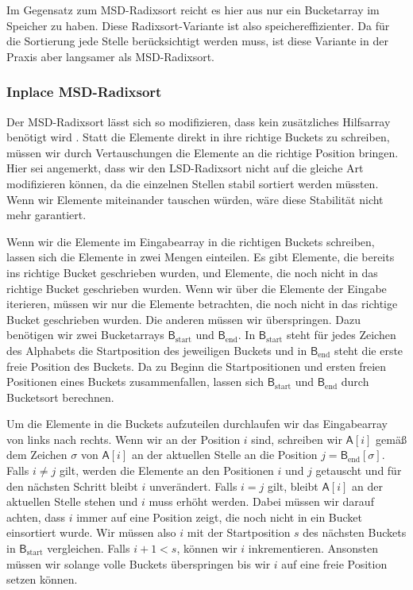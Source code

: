 Im Gegensatz zum MSD-Radixsort reicht es hier aus nur ein Bucketarray im Speicher zu haben.
Diese Radixsort-Variante ist also speichereffizienter.
Da für die Sortierung jede Stelle berücksichtigt werden muss,
ist diese Variante in der Praxis aber langsamer als MSD-Radixsort.

\subsubsection{Inplace MSD-Radixsort}
\label{sort:radix:inplace}

Der MSD-Radixsort lässt sich so modifizieren, dass kein zusätzliches Hilfsarray benötigt wird \cite{radixsort:inplace}.
Statt die Elemente direkt in ihre richtige Buckets zu schreiben,
müssen wir durch Vertauschungen die Elemente an die richtige Position bringen.
Hier sei angemerkt, dass wir den LSD-Radixsort nicht auf die gleiche Art modifizieren können,
da die einzelnen Stellen stabil sortiert werden müssten.
Wenn wir Elemente miteinander tauschen würden, wäre diese Stabilität nicht mehr garantiert.

Wenn wir die Elemente im Eingabearray in die richtigen Buckets schreiben,
lassen sich die Elemente in zwei Mengen einteilen.
Es gibt Elemente, die bereits ins richtige Bucket geschrieben wurden,
und Elemente, die noch nicht in das richtige Bucket geschrieben wurden.
Wenn wir über die Elemente der Eingabe iterieren, müssen wir nur die Elemente betrachten,
die noch nicht in das richtige Bucket geschrieben wurden.
Die anderen müssen wir überspringen.
Dazu benötigen wir zwei Bucketarrays $\mathsf{B}_{\text{start}}$ und $\mathsf{B}_{\text{end}}$.
In $\mathsf{B}_{\text{start}}$ steht für jedes Zeichen des Alphabets die Startposition des jeweiligen Buckets 
und in $\mathsf{B}_{\text{end}}$ steht die erste freie Position des Buckets.
Da zu Beginn die Startpositionen und ersten freien Positionen eines Buckets zusammenfallen,
lassen sich $\mathsf{B}_{\text{start}}$ und $\mathsf{B}_{\text{end}}$ durch Bucketsort berechnen.

Um die Elemente in die Buckets aufzuteilen durchlaufen wir das Eingabearray von links nach rechts.
Wenn wir an der Position $i$ sind, schreiben wir $\mathsf{A}[i]$ gemäß dem Zeichen $\sigma$ von $\mathsf{A}[i]$ an der
aktuellen Stelle an die Position $j = \mathsf{B}_{\text{end}}[\sigma]$.
Falls $i \ne j$ gilt, werden die Elemente an den Positionen $i$ und $j$ getauscht
und für den nächsten Schritt bleibt $i$ unverändert.
Falls $i = j$ gilt, bleibt $\mathsf{A}[i]$ an der aktuellen Stelle stehen und $i$ muss erhöht werden.
Dabei müssen wir darauf achten, dass $i$ immer auf eine Position zeigt,
die noch nicht in ein Bucket einsortiert wurde.
Wir müssen also $i$ mit der Startposition $s$ des nächsten Buckets in $\mathsf{B}_{\text{start}}$ vergleichen.
Falls $i+1 < s$, können wir $i$ inkrementieren.
Ansonsten müssen wir solange volle Buckets überspringen bis wir $i$ auf eine freie Position setzen können.

